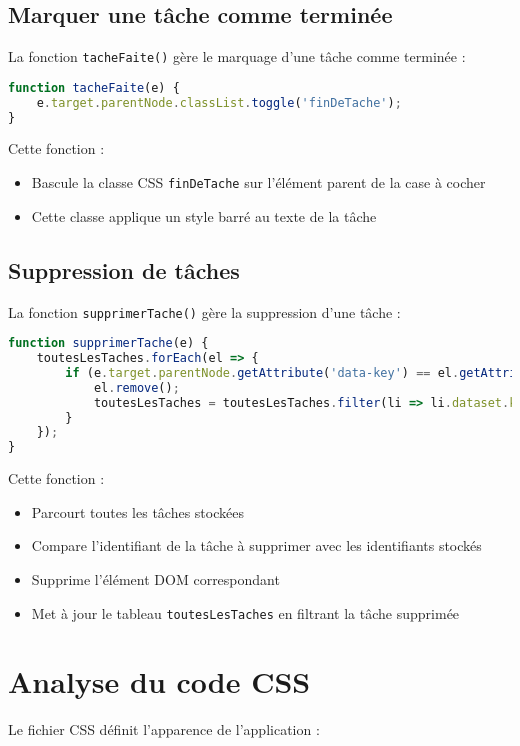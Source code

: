 \documentclass{article}
\begin{document}
\subsection{Marquer une tâche comme terminée}
La fonction \texttt{tacheFaite()} gère le marquage d'une tâche comme terminée :

\begin{lstlisting}[language=JavaScript]
function tacheFaite(e) {
    e.target.parentNode.classList.toggle('finDeTache');
}
\end{lstlisting}

Cette fonction :
\begin{itemize}
    \item Bascule la classe CSS \texttt{finDeTache} sur l'élément parent de la case à cocher
    \item Cette classe applique un style barré au texte de la tâche
\end{itemize}

\subsection{Suppression de tâches}
La fonction \texttt{supprimerTache()} gère la suppression d'une tâche :

\begin{lstlisting}[language=JavaScript]
function supprimerTache(e) {
    toutesLesTaches.forEach(el => {
        if (e.target.parentNode.getAttribute('data-key') == el.getAttribute('data-key')) {
            el.remove();
            toutesLesTaches = toutesLesTaches.filter(li => li.dataset.key !== el.dataset.key);
        }
    });
}
\end{lstlisting}

Cette fonction :
\begin{itemize}
    \item Parcourt toutes les tâches stockées
    \item Compare l'identifiant de la tâche à supprimer avec les identifiants stockés
    \item Supprime l'élément DOM correspondant
    \item Met à jour le tableau \texttt{toutesLesTaches} en filtrant la tâche supprimée
\end{itemize}

\section{Analyse du code CSS}
Le fichier CSS définit l'apparence de l'application :
\end{document}
